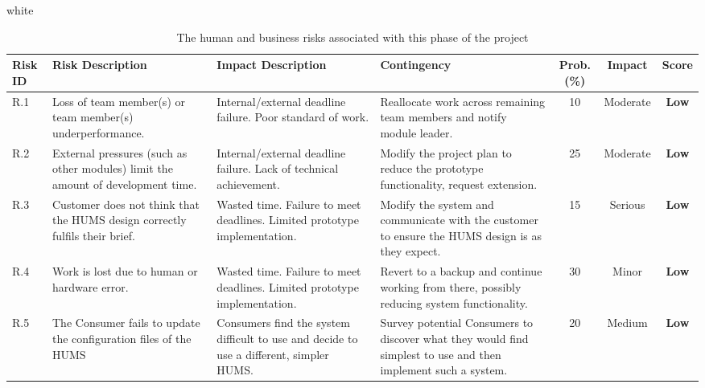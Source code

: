 \documentclass[10pt,a4paper]{article}
\newcommand{\xtableformat}[4]{
\begin{table}[ht!]
\centering
  \rowcolors{2}{gray!10} {white}
\begin{tabularx}{\textwidth}{#1}
  \hline
  \rowcolor[gray]{0.9} #2
  \hline
\end{tabularx}
\caption{#3}
\label{#4}
\end{table}}
\begin{document}
\xtableformat{p{0.8cm} X X X c c c }
{ 	\hline
  	Risk ID & Risk Description & Impact Description & Contingency & Prob.(\%) & Impact & Score \\
  	\hline
  
    R.1 & Loss of team member(s) or team member(s) underperformance. & Internal/external deadline failure. Poor standard of work. & Reallocate work across remaining team members and notify module leader. & 10 & Moderate & \textbf{Low} \\
    R.2 & External pressures (such as other modules) limit the amount of development time. & Internal/external deadline failure. Lack of technical achievement. & Modify the project plan to reduce the prototype functionality, request extension. & 25 & Moderate &  \textbf{Low} \\
    R.3 & Customer does not think that the HUMS design correctly fulfils their brief. & Wasted time. Failure to meet deadlines. Limited prototype implementation. & Modify the system and communicate with the customer to ensure the HUMS design is as they expect. & 15 & Serious &  \textbf{Low} \\
    R.4 & Work is lost due to human or hardware error. & Wasted time. Failure to meet deadlines. Limited prototype implementation. & Revert to a backup and continue working from there, possibly reducing system functionality. & 30 & Minor &  \textbf{Low} \\
    R.5 & The Consumer fails to update the configuration files of the HUMS  & Consumers find the system difficult to use and decide to use a different, simpler HUMS. & Survey potential Consumers to discover what they would find simplest to use and then implement such a system. & 20 & Medium & \textbf{Low} \\	
}
{The human and business risks associated with this phase of the project}{tab:human_risks}
\end{document}
